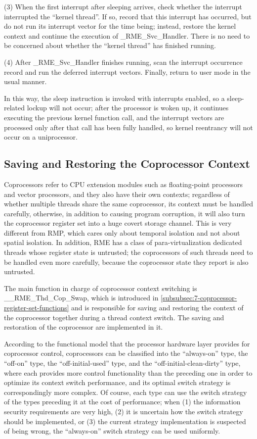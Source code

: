 (3) When the first interrupt after sleeping arrives, check whether the interrupt interrupted the ``kernel thread''. If so, record that this interrupt has occurred, but do not run its interrupt vector for the time being; instead, restore the kernel context and continue the execution of \_RME\_Svc\_Handler. There is no need to be concerned about whether the ``kernel thread'' has finished running.

(4) After \_RME\_Svc\_Handler finishes running, scan the interrupt occurrence record and run the deferred interrupt vectors. Finally, return to user mode in the usual manner.

In this way, the sleep instruction is invoked with interrupts enabled, so a sleep-related lockup will not occur; after the processor is woken up, it continues executing the previous kernel function call, and the interrupt vectors are processed only after that call has been fully handled, so kernel reentrancy will not occur on a uniprocessor.

\subsection{Saving and Restoring the Coprocessor Context}\label{subsec:9-coprocessor-context-switch}

Coprocessors refer to CPU extension modules such as floating-point processors and vector processors, and they also have their own contexts; regardless of whether multiple threads share the same coprocessor, its context must be handled carefully, otherwise, in addition to causing program corruption, it will also turn the coprocessor register set into a huge covert storage channel. This is very different from RMP, which cares only about temporal isolation and not about spatial isolation. In addition, RME has a class of para-virtualization dedicated threads whose register state is untrusted; the coprocessors of such threads need to be handled even more carefully, because the coprocessor state they report is also untrusted.

The main function in charge of coprocessor context switching is \_\_RME\_Thd\_Cop\_Swap, which is introduced in \ref{subsubsec:7-coprocessor-register-set-functions}
and is responsible for saving and restoring the context of the coprocessor together during a thread context switch. The saving and restoration of the coprocessor are implemented in it.

According to the functional model that the processor hardware layer provides for coprocessor control, coprocessors can be classified into the ``always-on'' type, the ``off-on'' type, the ``off-initial-used'' type, and the ``off-initial-clean-dirty'' type, where each provides more control functionality than the preceding one in order to optimize its context switch performance, and its optimal switch strategy is correspondingly more complex. Of course, each type can use the switch strategy of the types preceding it at the cost of performance; when (1) the information security requirements are very high, (2) it is uncertain how the switch strategy should be implemented, or (3) the current strategy implementation is suspected of being wrong, the ``always-on'' switch strategy can be used uniformly.

